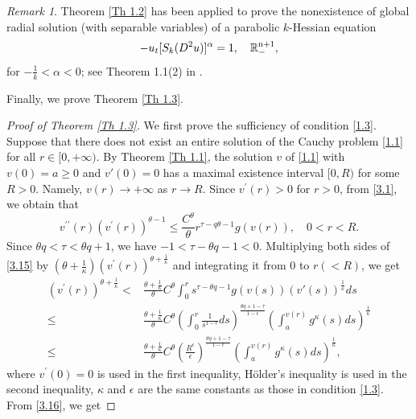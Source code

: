 \documentclass[a4paper,11pt]{amsart}
\theoremstyle{plain}
\theoremstyle{remark}
\newtheorem{remark}{Remark}
\numberwithin{equation}{section}
\numberwithin{figure}{section}
\numberwithin{remark}{section}
\begin{document}
\begin{sloppypar}
\begin{remark}
Theorem \ref{Th 1.2} has been applied to prove the nonexistence of global radial solution (with separable variables) of a parabolic $k$-Hessian equation
$$
-u_t [S_k(D^2u)]^\alpha =1, \quad {\rm \mathbb{R}^{n+1}_{-}},
$$
for $-\frac{1}{k}<\alpha<0$; see Theorem 1.1(2) in \cite{CJ2026}.
\end{remark}

Finally, we prove Theorem \ref{Th 1.3}.
\begin{proof}[Proof of Theorem \ref{Th 1.3}]
We first prove the sufficiency of condition \eqref{1.3}. Suppose that there does not exist an entire solution of the Cauchy problem \eqref{1.1} for all $r\in [0, +\infty)$. By Theorem \ref{Th 1.1}, the solution $v$ of \eqref{1.1} with $v(0)=a\ge 0$ and $v'(0)=0$ has a maximal existence interval $[0, R)$ for some $R>0$. Namely, $v(r)\rightarrow +\infty$ as $r\rightarrow R$. Since $v^{\prime}(r)>0$ for $r>0$, from \eqref{3.1}, we obtain that
\begin{equation}\label{3.15}
v^{\prime\prime}(r)\left( v^{\prime}(r)\right)^{\theta-1}
\le \frac{C^\theta}{\theta}r^{\tau-q\theta -1} g(v(r)), \quad 0<r<R.
\end{equation}
Since $\theta q<\tau < \theta q+1$, we have $-1<\tau - \theta q -1 <0$.
Multiplying both sides of \eqref{3.15} by $(\theta+\frac{1}{\kappa})(v^{\prime}(r))^{\theta +\frac{1}{\kappa}}$ and integrating it from $0$ to $r (<R)$, we get
\begin{equation}\label{3.16}
\begin{aligned}
	    \left( 	v^{\prime}(r)\right) ^{\theta +\frac{1}{\kappa}} 
	<   & \frac{\theta +\frac{1}{\kappa}}{\theta} C^\theta \int_{0}^{r} s^{\tau-\theta q -1} g (v(s)) (v'(s))^{\frac{1}{\kappa}}ds\\
	\le & \frac{\theta +\frac{1}{\kappa}}{\theta} C^\theta \left (\int_0^r \frac{1}{s^{1-\epsilon}} ds\right)^{\frac{\theta q +1-\tau}{1-\epsilon}}
	\left( \int_a^{v(r)} g^{\kappa} (s)ds\right)^{\frac{1}{\kappa}} \\
	\le & \frac{\theta +\frac{1}{\kappa}}{\theta} C^\theta \left (\frac{R^\epsilon}{\epsilon} \right)^{\frac{\theta q +1-\tau}{1-\epsilon}}
	\left( \int_a^{v(r)} g^{\kappa} (s)ds\right)^{\frac{1}{\kappa}},
\end{aligned}
\end{equation}
where $v^{\prime}(0)=0$ is used in the first inequality, H\"older's inequality is used in the second inequality, $\kappa$ and $\epsilon$ are the same constants as those in condition \eqref{1.3}. From \eqref{3.16}, we get

\end{proof}
\end{sloppypar}
\end{document}

